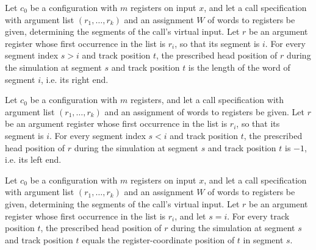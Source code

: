 \begin{lemma}
\label{Complexity.LogProg.regPos_of_lt}
\leanok
{}
Let $c_0$ be a configuration with $m$ registers on input $x$, and let a call specification
with argument list $(r_1,\dots,r_k)$ and an assignment $W$ of words to registers be given,
determining the segments of the call's virtual input. Let $r$ be an argument register
whose first occurrence in the list is $r_i$, so that its segment is $i$. For every
segment index $s>i$ and track position $t$, the prescribed head position of $r$ during
the simulation at segment $s$ and track position $t$ is the length of the word of
segment $i$, i.e. its right end.
\end{lemma}

\begin{lemma}
\label{Complexity.LogProg.regPos_of_gt}
\leanok
{}
Let $c_0$ be a configuration with $m$ registers, and let a call specification with
argument list $(r_1,\dots,r_k)$ and an assignment of words to registers be given. Let $r$
be an argument register whose first occurrence in the list is $r_i$, so that its segment
is $i$. For every segment index $s<i$ and track position $t$, the prescribed head
position of $r$ during the simulation at segment $s$ and track position $t$ is $-1$,
i.e. its left end.
\end{lemma}

\begin{lemma}
\label{Complexity.LogProg.regPos_of_eq}
\leanok
{}
Let $c_0$ be a configuration with $m$ registers on input $x$, and let a call specification
with argument list $(r_1,\dots,r_k)$ and an assignment $W$ of words to registers be given,
determining the segments of the call's virtual input. Let $r$ be an argument register
whose first occurrence in the list is $r_i$, and let $s=i$. For every track position $t$,
the prescribed head position of $r$ during the simulation at segment $s$ and track
position $t$ equals the register-coordinate position of $t$ in segment $s$.
\end{lemma}
